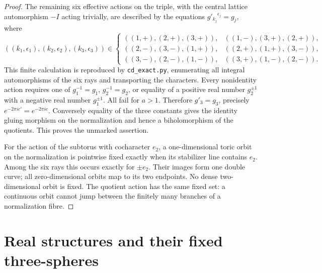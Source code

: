 \begin{proof}
The remaining six effective actions on the triple, with the central
lattice automorphism \(-I\) acting trivially, are described by the equations
\(g'_{k_j}{}^{\epsilon_j}=g_j\), where
\[
 ((k_1,\epsilon_1),(k_2,\epsilon_2),(k_3,\epsilon_3))
 \in\left\{
\begin{array}{lll}
((1,+),(2,+),(3,+)),&((1,-),(3,+),(2,+)),\\
((2,-),(3,-),(1,+)),&((2,+),(1,+),(3,-)),\\
((3,-),(2,-),(1,-)),&((3,+),(1,-),(2,-)).
\end{array}\right.
\]
This finite calculation is reproduced by \texttt{cd\_exact.py}, enumerating
all integral automorphisms of the six rays and transporting the characters.
Every nonidentity action requires one of
\(g_1^{-1}=g_1\), \(g_2^{-1}=g_2\), or equality of a positive real number
\(g_2^{\pm1}\) with a negative real number \(g_1^{\pm1}\).
All fail for \(a>1\). Therefore \(g'_3=g_3\), precisely
\(e^{-2\pi ic'}=e^{-2\pi ic}\). Conversely equality of the three constants
gives the identity gluing morphism on the normalization and hence a
biholomorphism of the quotients. This proves the unmarked assertion.

For the action of the subtorus with cocharacter \(e_2\), a one-dimensional
toric orbit on the normalization is pointwise fixed exactly when its
stabilizer line contains \(e_2\). Among the six rays this occurs exactly
for \(\pm e_2\). Their images form one double curve; all zero-dimensional
orbits map to its two endpoints. No dense two-dimensional orbit is fixed.
The quotient action has the same fixed set: a continuous orbit cannot
jump between the finitely many branches of a normalization fibre.
\end{proof}


\section{Real structures and their fixed three-spheres}\label{mapsI:real-forms}

